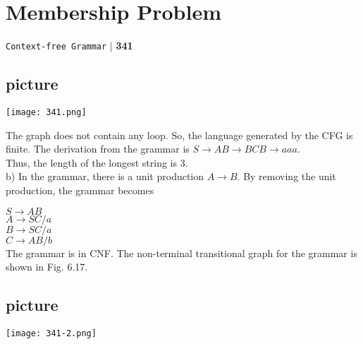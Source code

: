 \documentclass[a4,9pt]{beamer}
\begin{document}
\begin{frame}
\section*{Membership Problem}
\begin{flushright}
\texttt{Context-free Grammar} \hspace*{0.1cm}\textbf{$|$} \hspace*{0.1cm} \textbf{341}\hspace*{0.1cm}
\end{flushright}
\vspace*{0.3cm}

\begin{center}
  \section{picture}
\texttt{[image: 341.png]}
\end{center}

The graph does not contain any loop. So, the language generated by the CFG is finite. The derivation
from the grammar is $S \rightarrow AB \rightarrow BCB \rightarrow aaa$.\\
\hspace*{0.5cm} Thus, the length of the longest string is 3.\\

\vspace*{0.2cm}
\hspace*{-0.5cm} b) In the grammar, there is a unit production $A \rightarrow B$. By removing the unit production, the grammar
becomes\\
\end{frame}

\begin{frame}
\hspace*{4cm} $S \rightarrow AB$ \\
\hspace*{4cm} $A \rightarrow SC/a$ \\
\hspace*{4cm} $B \rightarrow SC/a$ \\
\hspace*{4cm} $C \rightarrow AB/b$ \\

\vspace*{0.2cm}
The grammar is in CNF. The non-terminal transitional graph for the grammar is shown in Fig. 6.17.\\


\begin{center}
  \section{picture}
\texttt{[image: 341-2.png]}
\end{center}

\end{frame}
\end{document}
